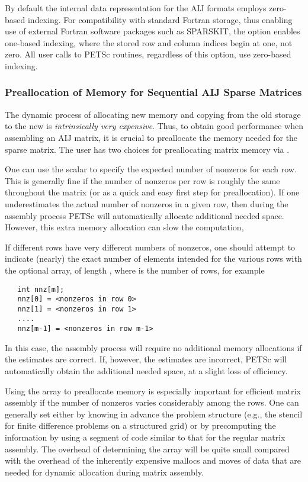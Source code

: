 By default the internal data representation for the AIJ formats employs
zero-based indexing.  For compatibility with standard Fortran storage,
thus enabling use of external Fortran software packages such as
SPARSKIT,  the option 
 enables one-based indexing, where the stored
row and column indices begin at one, not zero.  All user calls to
PETSc routines, regardless of this option, use zero-based indexing.

\subsubsection{Preallocation of Memory for Sequential AIJ Sparse Matrices}

The dynamic process of allocating new memory and copying from the old
storage to the new is {\em intrinsically very expensive}.  Thus, to
obtain good performance when assembling an AIJ matrix, it is crucial
to preallocate the memory needed for the sparse matrix.  The user has
two choices for preallocating matrix memory via . 

One can use the scalar  to specify the expected
number of nonzeros for each row.  This is generally fine if the number
of nonzeros per row is roughly the same throughout the matrix (or as a
quick and easy first step for preallocation).  If one underestimates
the actual number of nonzeros in a given row, then during the assembly
process PETSc will automatically allocate additional needed space.
However, this extra memory allocation can slow the computation,

If different rows have very different numbers of nonzeros, one
should attempt to indicate (nearly) the exact number of elements
intended for the various rows with the optional array,  of
length , where  is the number of rows, for example
\begin{verbatim}
   int nnz[m];
   nnz[0] = <nonzeros in row 0>
   nnz[1] = <nonzeros in row 1>
   ....
   nnz[m-1] = <nonzeros in row m-1>
\end{verbatim}
In this case, the assembly process will require no additional memory
allocations if the  estimates are correct. If, however,
the  estimates are incorrect, PETSc will automatically
obtain the additional needed space, at a slight loss of efficiency.

Using the array  to preallocate memory is especially
important for efficient matrix assembly if the number of nonzeros
varies considerably among the rows.  One can generally set 
either by knowing in advance the problem structure (e.g., the stencil
for finite difference problems on a structured grid) or by
precomputing the information by using a segment of code similar to
that for the regular matrix assembly.  The overhead of determining the
 array will be quite small compared with the overhead of the
inherently expensive mallocs and moves of data that are needed for
dynamic allocation during matrix assembly.

